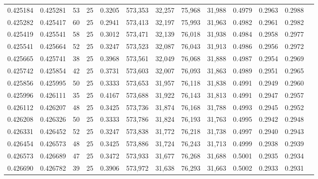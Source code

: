 \begin{tabular}{rrrrrrrrrrrrr}
0.425184 & 0.425281 &    53 &  25 &                                     0.3205 & 573,353 &  32,257 &  75,968 &  31,988 & 0.4979 & 0.2963 & 0.2988 \\
0.425282 & 0.425417 &    60 &  25 &                                     0.2941 & 573,413 &  32,197 &  75,993 &  31,963 & 0.4982 & 0.2961 & 0.2982 \\
0.425419 & 0.425541 &    58 &  25 &                                     0.3012 & 573,471 &  32,139 &  76,018 &  31,938 & 0.4984 & 0.2958 & 0.2977 \\
0.425541 & 0.425664 &    52 &  25 &                                     0.3247 & 573,523 &  32,087 &  76,043 &  31,913 & 0.4986 & 0.2956 & 0.2972 \\
0.425665 & 0.425741 &    38 &  25 &                                     0.3968 & 573,561 &  32,049 &  76,068 &  31,888 & 0.4987 & 0.2954 & 0.2969 \\
0.425742 & 0.425854 &    42 &  25 &                                     0.3731 & 573,603 &  32,007 &  76,093 &  31,863 & 0.4989 & 0.2951 & 0.2965 \\
0.425856 & 0.425995 &    50 &  25 &                                     0.3333 & 573,653 &  31,957 &  76,118 &  31,838 & 0.4991 & 0.2949 & 0.2960 \\
0.425996 & 0.426111 &    35 &  25 &                                     0.4167 & 573,688 &  31,922 &  76,143 &  31,813 & 0.4991 & 0.2947 & 0.2957 \\
0.426112 & 0.426207 &    48 &  25 &                                     0.3425 & 573,736 &  31,874 &  76,168 &  31,788 & 0.4993 & 0.2945 & 0.2952 \\
0.426208 & 0.426326 &    50 &  25 &                                     0.3333 & 573,786 &  31,824 &  76,193 &  31,763 & 0.4995 & 0.2942 & 0.2948 \\
0.426331 & 0.426452 &    52 &  25 &                                     0.3247 & 573,838 &  31,772 &  76,218 &  31,738 & 0.4997 & 0.2940 & 0.2943 \\
0.426454 & 0.426573 &    48 &  25 &                                     0.3425 & 573,886 &  31,724 &  76,243 &  31,713 & 0.4999 & 0.2938 & 0.2939 \\
0.426573 & 0.426689 &    47 &  25 &                                     0.3472 & 573,933 &  31,677 &  76,268 &  31,688 & 0.5001 & 0.2935 & 0.2934 \\
0.426690 & 0.426782 &    39 &  25 &                                     0.3906 & 573,972 &  31,638 &  76,293 &  31,663 & 0.5002 & 0.2933 & 0.2931 \\

\end{tabular}
